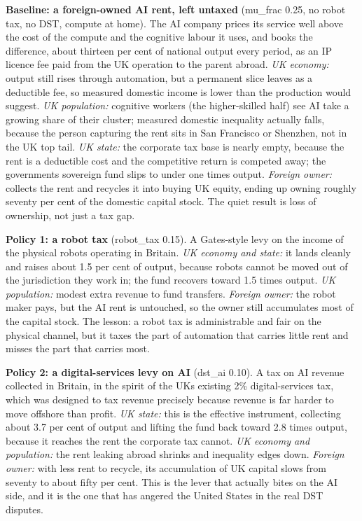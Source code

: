 \documentclass[12pt]{article}
\begin{document}
\textbf{Baseline: a foreign-owned AI rent, left untaxed} (mu\_frac 0.25,
no robot tax, no DST, compute at home). The AI company prices its
service well above the cost of the compute and the cognitive labour it
uses, and books the difference, about thirteen per cent of national
output every period, as an IP licence fee paid from the UK operation to
the parent abroad. \emph{UK economy:} output still rises through
automation, but a permanent slice leaves as a deductible fee, so
measured domestic income is lower than the production would suggest.
\emph{UK population:} cognitive workers (the higher-skilled half) see AI
take a growing share of their cluster; measured domestic inequality
actually falls, because the person capturing the rent sits in San
Francisco or Shenzhen, not in the UK top tail. \emph{UK state:} the
corporate tax base is nearly empty, because the rent is a deductible
cost and the competitive return is competed away; the
government\textquotesingle s sovereign fund slips to under one times
output. \emph{Foreign owner:} collects the rent and recycles it into
buying UK equity, ending up owning roughly seventy per cent of the
domestic capital stock. The quiet result is loss of ownership, not just
a tax gap.

\textbf{Policy 1: a robot tax} (robot\_tax 0.15). A Gates-style levy on
the income of the physical robots operating in Britain. \emph{UK economy
and state:} it lands cleanly and raises about 1.5 per cent of output,
because robots cannot be moved out of the jurisdiction they work in; the
fund recovers toward 1.5 times output. \emph{UK population:} modest
extra revenue to fund transfers. \emph{Foreign owner:} the robot maker
pays, but the AI rent is untouched, so the owner still accumulates most
of the capital stock. The lesson: a robot tax is administrable and fair
on the physical channel, but it taxes the part of automation that
carries little rent and misses the part that carries most.

\textbf{Policy 2: a digital-services levy on AI} (dst\_ai 0.10). A tax
on AI revenue collected in Britain, in the spirit of the
UK\textquotesingle s existing 2\% digital-services tax, which was
designed to tax revenue precisely because revenue is far harder to move
offshore than profit. \emph{UK state:} this is the effective instrument,
collecting about 3.7 per cent of output and lifting the fund back toward
2.8 times output, because it reaches the rent the corporate tax cannot.
\emph{UK economy and population:} the rent leaking abroad shrinks and
inequality edges down. \emph{Foreign owner:} with less rent to recycle,
its accumulation of UK capital slows from seventy to about fifty per
cent. This is the lever that actually bites on the AI side, and it is
the one that has angered the United States in the real DST disputes.
\end{document}
